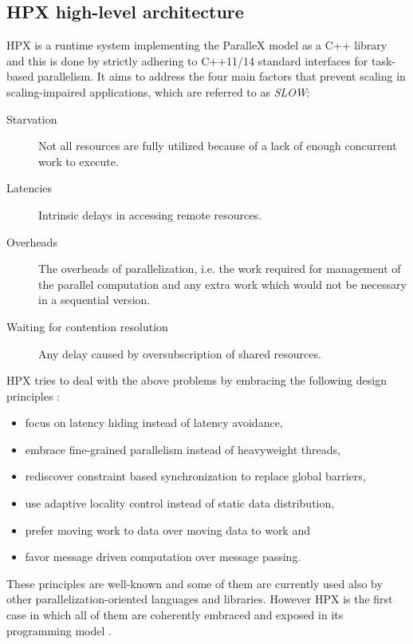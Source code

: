 
\subsection{HPX high-level architecture}
HPX is a runtime system implementing the ParalleX model as a C++ library and this is done by strictly adhering to C++11/14 standard interfaces for task-based parallelism.
It aims to address the four main factors that prevent scaling in scaling-impaired applications, which are referred to as \emph{SLOW}\cite{kaiser2014hpx}:
\begin{description}
	\item [Starvation] Not all resources are fully utilized because of a lack of enough concurrent work to execute.
	\item [Latencies] Intrinsic delays in accessing remote resources.
	\item [Overheads] The overheads of parallelization, i.e. the work required for management of the parallel computation and any extra work which would not be necessary in a sequential version.
	\item [Waiting for contention resolution] Any delay caused by oversubscription of shared resources.
\end{description}

HPX tries to deal with the above problems by embracing the following design principles \cite{kaiser2014hpx}:
\begin{itemize}
	\item focus on latency hiding instead of latency avoidance,
	\item embrace fine-grained parallelism instead of heavyweight threads,
	\item rediscover constraint based synchronization to replace global barriers,
	\item use adaptive locality control instead of static data distribution, 
	\item prefer moving work to data over moving data to work and 
	\item favor message driven computation over message passing.
\end{itemize}
These principles are well-known and some of them are currently used also by other parallelization-oriented languages and libraries. However HPX is the first case in which all of them are coherently embraced and exposed in its programming model \cite{kaiser2014hpx}.

